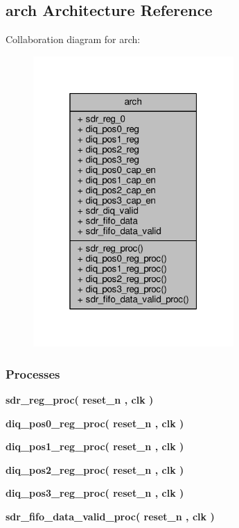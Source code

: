 \subsection{arch Architecture Reference}
\label{classrxiq__siso__sdr_1_1arch}


Collaboration diagram for arch\+:\nopagebreak
\begin{figure}[H]
\begin{center}
\leavevmode
\includegraphics[width=217pt]{da/d3e/classrxiq__siso__sdr_1_1arch__coll__graph}
\end{center}
\end{figure}
\subsubsection*{Processes}
 \begin{DoxyCompactItemize}
\item 
{\bf sdr\+\_\+reg\+\_\+proc}{\bfseries  ( {\bfseries {\bfseries {\bf reset\+\_\+n}} \textcolor{vhdlchar}{ }} , {\bfseries {\bfseries {\bf clk}} \textcolor{vhdlchar}{ }} )}
\item 
{\bf diq\+\_\+pos0\+\_\+reg\+\_\+proc}{\bfseries  ( {\bfseries {\bfseries {\bf reset\+\_\+n}} \textcolor{vhdlchar}{ }} , {\bfseries {\bfseries {\bf clk}} \textcolor{vhdlchar}{ }} )}
\item 
{\bf diq\+\_\+pos1\+\_\+reg\+\_\+proc}{\bfseries  ( {\bfseries {\bfseries {\bf reset\+\_\+n}} \textcolor{vhdlchar}{ }} , {\bfseries {\bfseries {\bf clk}} \textcolor{vhdlchar}{ }} )}
\item 
{\bf diq\+\_\+pos2\+\_\+reg\+\_\+proc}{\bfseries  ( {\bfseries {\bfseries {\bf reset\+\_\+n}} \textcolor{vhdlchar}{ }} , {\bfseries {\bfseries {\bf clk}} \textcolor{vhdlchar}{ }} )}
\item 
{\bf diq\+\_\+pos3\+\_\+reg\+\_\+proc}{\bfseries  ( {\bfseries {\bfseries {\bf reset\+\_\+n}} \textcolor{vhdlchar}{ }} , {\bfseries {\bfseries {\bf clk}} \textcolor{vhdlchar}{ }} )}
\item 
{\bf sdr\+\_\+fifo\+\_\+data\+\_\+valid\+\_\+proc}{\bfseries  ( {\bfseries {\bfseries {\bf reset\+\_\+n}} \textcolor{vhdlchar}{ }} , {\bfseries {\bfseries {\bf clk}} \textcolor{vhdlchar}{ }} )}
\end{DoxyCompactItemize}
